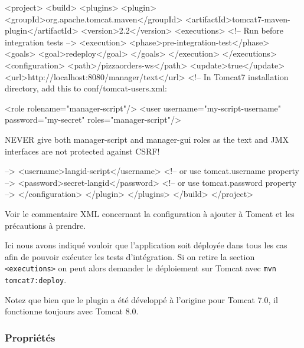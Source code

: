\begin{xmlcode}
<project>
    <build>
        <plugins>
            <plugin>
                <groupId>org.apache.tomcat.maven</groupId>
                <artifactId>tomcat7-maven-plugin</artifactId>
                <version>2.2</version>
                <executions>
                    <!-- Run before integration tests -->
                    <execution>
                        <phase>pre-integration-test</phase>
                        <goals>
                            <goal>redeploy</goal>
                        </goals>
                    </execution>
                </executions>
                <configuration>
                    <path>/pizzaorders-ws</path>
                    <update>true</update>
                    <url>http://localhost:8080/manager/text</url>
                    <!--
                    In Tomcat7 installation directory, add this to conf/tomcat-users.xml:

                    <role rolename="manager-script"/>
                    <user username="my-script-username" 
                          password="my-secret" 
                             roles="manager-script"/>

                    NEVER give both manager-script and manager-gui roles 
                    as the text and JMX interfaces
                    are not protected against CSRF!

                    -->
                    <username>langid-script</username>
                    <!-- or use tomcat.username property -->
                    <password>secret-langid</password>
                    <!-- or use tomcat.password property -->
                </configuration>
            </plugin>
        </plugins>
    </build>
</project>
\end{xmlcode}

Voir le commentaire XML concernant la configuration à ajouter à Tomcat et les précautions à prendre.

Ici nous avons indiqué vouloir que l'application soit déployée dans tous les cas
afin de pouvoir exécuter les tests d'intégration. Si on retire la section \verb|<executions>|
on peut alors demander le déploiement sur Tomcat avec \verb|mvn tomcat7:deploy|.

Notez que bien que le plugin a été développé à l'origine pour Tomcat 7.0, il fonctionne toujours avec Tomcat 8.0.

\subsubsection{Propriétés}

